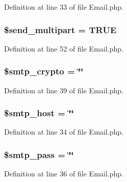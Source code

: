 Definition at line 33 of file Email.\-php.

\subsubsection[{\$send\-\_\-multipart}]{\setlength{\rightskip}{0pt plus 5cm}\$send\-\_\-multipart = T\-R\-U\-E}\label{class_c_i___email_ad646213e73754a396d49eacaa7fc8218}


Definition at line 52 of file Email.\-php.

\subsubsection[{\$smtp\-\_\-crypto}]{\setlength{\rightskip}{0pt plus 5cm}\$smtp\-\_\-crypto = \char`\"{}\char`\"{}}\label{class_c_i___email_ab324ab40108bacab087e18556627ef1e}


Definition at line 39 of file Email.\-php.

\subsubsection[{\$smtp\-\_\-host}]{\setlength{\rightskip}{0pt plus 5cm}\$smtp\-\_\-host = \char`\"{}\char`\"{}}\label{class_c_i___email_aa1ef5144d9ef39807b72f29299128eb1}


Definition at line 34 of file Email.\-php.

\subsubsection[{\$smtp\-\_\-pass}]{\setlength{\rightskip}{0pt plus 5cm}\$smtp\-\_\-pass = \char`\"{}\char`\"{}}\label{class_c_i___email_ae8b7daa14d7182bd564f04f752948400}


Definition at line 36 of file Email.\-php.

